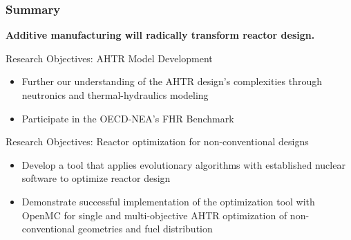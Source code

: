 \begin{frame}
    \frametitle{Summary}
    \textbf{Additive manufacturing will radically transform reactor design.}
    \begin{block}{Research Objectives: AHTR Model Development}
        \begin{itemize}
            \item Further our understanding of the AHTR design's complexities 
            through neutronics and thermal-hydraulics modeling
            \item Participate in the OECD-NEA's FHR Benchmark
        \end{itemize}
    \end{block}

    \begin{block}{Research Objectives: Reactor optimization for non-conventional designs}
        \begin{itemize}
            \item Develop a tool that applies evolutionary algorithms with established 
            nuclear software to optimize reactor design
            \item Demonstrate successful implementation of the optimization tool 
            with OpenMC for single and multi-objective AHTR optimization of 
            non-conventional geometries and fuel distribution
        \end{itemize}
    \end{block}
\end{frame}